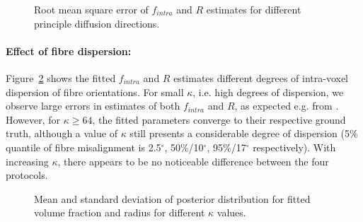 \begin{figure}[!h]
\centering
    
    
    
  	\caption{Root mean square error of $f_{intra}$ and $R$ estimates for different principle diffusion directions.}
	\label{fig:chapter7 exp1 angular vals 60mT}
\end{figure}


\paragraph{Effect of fibre dispersion: } Figure~\ref{fig:chapter7 exp1 dispersion 60mT} shows the fitted $f_{intra}$ and $R$ estimates different degrees of intra-voxel dispersion of fibre orientations. For small $\kappa$, i.e. high degrees of dispersion, we observe large errors in estimates of both $f_{intra}$ and $R$, as expected e.g. from \citep{Zhang:2011}. However, for $\kappa \ge 64$, the fitted parameters converge to their respective ground truth, although a value of $\kappa$ still presents a considerable degree of dispersion (5\% quantile of fibre misalignment  is 2.5$^\circ$, 50\%/10$^\circ$, 95\%/17$^\circ$ respectively). With increasing $\kappa$, there appears to be no noticeable difference between the four protocols.

\begin{figure}[ht]
	\centering
	
	
	\caption{Mean and standard deviation of posterior distribution for fitted volume fraction and radius for different $\kappa$ values.}
	\label{fig:chapter7 exp1 dispersion 60mT}
\end{figure}

